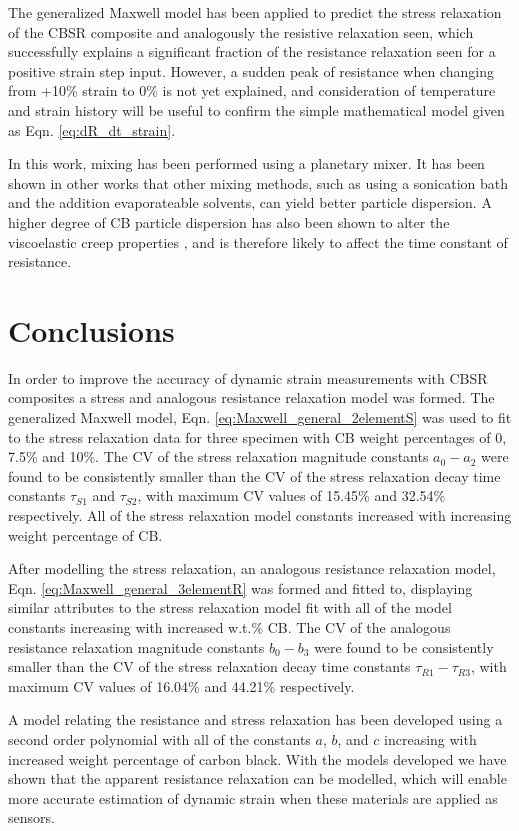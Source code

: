 The generalized Maxwell model has been applied to predict the stress relaxation of the CBSR composite and analogously the resistive relaxation seen, which successfully explains a significant fraction of the resistance relaxation seen for a positive strain step input. However, a sudden peak of resistance when changing from +10\% strain to 0\% is not yet explained, and consideration of temperature and strain history\cite{Fung1993} will be useful to confirm the simple mathematical model given as Eqn. \ref{eq:dR_dt_strain}.

In this work, mixing has been performed using a planetary mixer. It has been shown in other works \cite{Xu2016,Spahr2017} that other mixing methods, such as using a sonication bath and the addition evaporateable solvents, can yield better particle dispersion. A higher degree of CB particle dispersion has also been shown to alter the viscoelastic creep properties \cite{Xu2016}, and is therefore likely to affect the time constant of resistance.




\section{Conclusions}
In order to improve the accuracy of dynamic strain measurements with CBSR composites a stress and analogous resistance relaxation model was formed. The generalized Maxwell model, Eqn. \ref{eq:Maxwell_general_2elementS} was used to fit to the stress relaxation data for three specimen with CB weight percentages of 0, 7.5\% and 10\%. The CV of the stress relaxation magnitude constants $a_0-a_2$ were found to be consistently smaller than the CV of the stress relaxation decay time constants $\tau_{S1}$ and $\tau_{S2}$, with maximum CV values of 15.45\% and 32.54\% respectively. All of the stress relaxation model constants increased with increasing weight percentage of CB.

After modelling the stress relaxation, an analogous resistance relaxation model, Eqn. \ref{eq:Maxwell_general_3elementR} was formed and fitted to, displaying similar attributes to the stress relaxation model fit with all of the model constants increasing with increased w.t.\% CB. The CV of the analogous resistance relaxation magnitude constants $b_0-b_3$ were found to be consistently smaller than the CV of the stress relaxation decay time constants $\tau_{R1}-\tau_{R3}$, with maximum CV values of 16.04\% and 44.21\% respectively.

A model relating the resistance and stress relaxation has been developed using a second order polynomial with all of the constants $a$, $b$, and $c$ increasing with increased weight percentage of carbon black. With the models developed we have shown that the apparent resistance relaxation can be modelled, which will enable more accurate estimation of dynamic strain when these materials are applied as sensors. 
